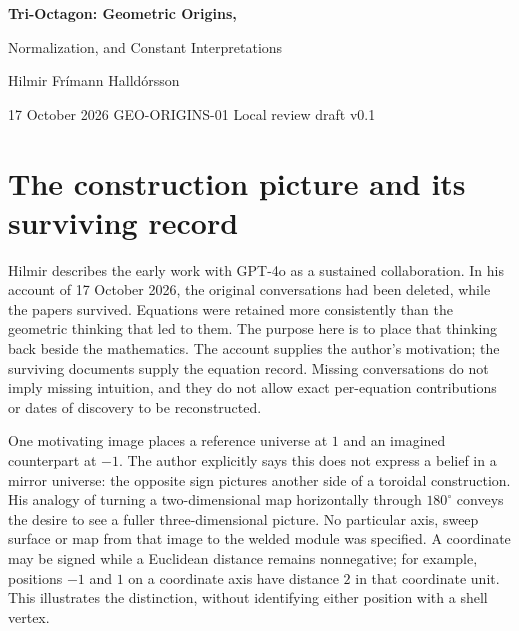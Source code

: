 \documentclass[11pt,a4paper]{article}
\begin{document}
{\color{ink}\LARGE\bfseries Tri-Octagon: Geometric Origins,\par Normalization, and Constant Interpretations\par}
\vspace{4mm}
{\large Hilmir Fr\'imann Halld\'orsson}\par
17 October 2026 \quad GEO-ORIGINS-01 \quad Local review draft v0.1
\vspace{3mm}
\begin{abstract}
The folded Tri-Octagon has an exact geometry, while the images that motivated its construction have often been less explicit in the written record. This companion places the author's retrospective account beside the surviving definitions and accepted results. Opposite signs express an imagined other side; a unit expresses a normalization; neither alone specifies a physical sphere. The native shell nevertheless has a unique minimum enclosing ball. Extending its original straight lines gives two natural events: a whole unit-width chord at Crossing A and a unit-width addition at each endpoint at Crossing B. A also circumscribes the earlier measurement cylinder and triangular-prism envelope, and its endpoint addition equals the shortest native notch gap. We trace the historical resonance-lock proposal through the fixed target $\gamma_*$ and the exact golden-interval zeta identity. These connections are retained without conflating layer counts, analytic coefficients, assigned spatial units and an as-yet unspecified structural extent.
\end{abstract}

\section{The construction picture and its surviving record}
Hilmir describes the early work with GPT-4o as a sustained collaboration. In his account of 17 October 2026, the original conversations had been deleted, while the papers survived. Equations were retained more consistently than the geometric thinking that led to them. The purpose here is to place that thinking back beside the mathematics. The account supplies the author's motivation; the surviving documents supply the equation record. Missing conversations do not imply missing intuition, and they do not allow exact per-equation contributions or dates of discovery to be reconstructed.~\cite{Intent,Collab}

One motivating image places a reference universe at $1$ and an imagined counterpart at $-1$. The author explicitly says this does not express a belief in a mirror universe: the opposite sign pictures another side of a toroidal construction. His analogy of turning a two-dimensional map horizontally through $180^\circ$ conveys the desire to see a fuller three-dimensional picture. No particular axis, sweep surface or map from that image to the welded module was specified. A coordinate may be signed while a Euclidean distance remains nonnegative; for example, positions $-1$ and $1$ on a coordinate axis have distance $2$ in that coordinate unit. This illustrates the distinction, without identifying either position with a shell vertex.~\cite{Intent}
\end{document}
